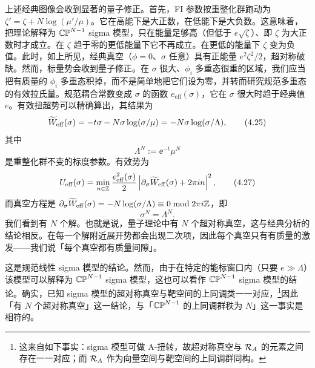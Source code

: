 上述经典图像会收到显著的量子修正。首先，FI 参数按重整化群跑动为 $\zeta'=\zeta+N\log(\mu'/\mu)$。它在高能下是大正数，在低能下是大负数。这意味着，把理论解释为 $\mathbb{CP}^{N-1}$ sigma 模型，只在能量足够高（但低于 $e\sqrt{\zeta}$）、即 $\zeta$ 为大正数时才成立。在 $\zeta$ 趋于零的更低能量下它不再成立。在更低的能量下 $\zeta$ 变为负值。此时，如上所见，经典真空（$\phi=0$、$\sigma$ 任意）具有正能量 $e^2\zeta^2/2$，超对称破缺。然而，标量势会收到量子修正。在 $\sigma$ 很大、$\phi_i$ 多重态很重的区域，我们应当把有质量的
$\phi_i$ 多重态积掉，而不是简单地把它们设为零，并转而研究规范多重态的有效拉氏量。规范耦合常数变成 $\sigma$ 的函数 $e_{\mathrm{eff}}(\sigma)$，它在 $\sigma$ 很大时趋于经典值 $e$。有效扭超势可以精确算出，其结果为
\begin{equation}
    \widetilde{W}_{\mathrm{eff}}(\sigma) = -t\sigma - N\sigma\log(\sigma/\mu) = -N\sigma\log(\sigma/\Lambda), \tag{4.25}
\end{equation}
其中
\begin{equation}
    \Lambda^N := \ee^{-t}\mu^N \tag{4.26}
\end{equation}
是重整化群不变的标度参数。有效势为
\begin{equation}
    U_{\mathrm{eff}}(\sigma) = \min_{n\in\mathbb{Z}}\frac{e_{\mathrm{eff}}^2(\sigma)}{2}
    \left|\partial_\sigma\widetilde{W}_{\mathrm{eff}}(\sigma)+2\pi i n\right|^2, \tag{4.27}
\end{equation}
而真空方程是 $\partial_\sigma\widetilde{W}_{\mathrm{eff}}(\sigma)=-N\log(\sigma/\Lambda)\equiv 0 \bmod 2\pi i\mathbb{Z}$，即
\begin{equation}
    \sigma^N = \Lambda^N. \tag{4.28}
\end{equation}
我们看到有 $N$ 个解。也就是说，量子理论中有 $N$ 个超对称真空，这与经典分析的结论相反。在每一个解附近展开势都会出现二次项，因此每个真空只有有质量的激发——我们说「每个真空都有质量间隙」。

这是规范线性 sigma 模型的结论。然而，由于在特定的能标窗口内（只要 $e\gg\Lambda$）该模型可以解释为 $\mathbb{CP}^{N-1}$ sigma 模型，这也可以看作 $\mathbb{CP}^{N-1}$ sigma 模型的结论。确实，已知 sigma 模型的超对称真空与靶空间的上同调类一一对应，\footnote{这来自如下事实：sigma 模型可做 A-扭转，故超对称真空与 $\mathcal{R}_A$ 的元素之间存在一一对应；而 $\mathcal{R}_A$ 作为向量空间与靶空间的上同调群同构。}因此「有 $N$ 个超对称真空」这一结论，与「$\mathbb{CP}^{N-1}$ 的上同调群秩为 $N$」这一事实是相符的。
